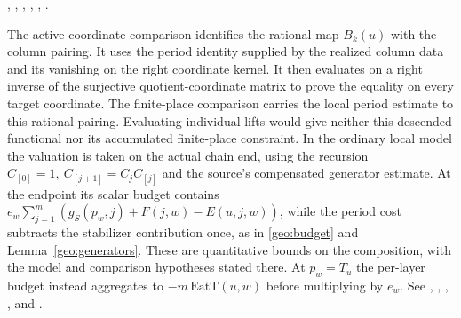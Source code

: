 \noindent
{},
,
,
,
,
.

The active coordinate comparison  identifies the rational map \(B_k(u)\) with the column pairing. It uses the period identity supplied by the realized column data and its vanishing on the right coordinate kernel. It then evaluates on a right inverse of the surjective quotient-coordinate matrix to prove the equality on every target coordinate. The finite-place comparison  carries the local period estimate to this rational pairing. Evaluating individual lifts would give neither this descended functional nor its accumulated finite-place constraint. In the ordinary local model the valuation is taken on the actual chain end, using the recursion \(C_{[0]}=1,\ C_{[j+1]}=C_j C_{[j]}\) and the source's compensated generator estimate. At the endpoint its scalar budget contains \(e_w\sum_{j=1}^{m}(g_S(p_w,j)+F(j,w)-E(u,j,w))\), while the period cost subtracts the stabilizer contribution once, as in \eqref{geo:budget} and Lemma~\ref{geo:generators}. These are quantitative bounds on the composition, with the model and comparison hypotheses stated there. At \(p_w=T_u\) the per-layer budget instead aggregates to \(-m\,\mathrm{EatT}(u,w)\) before multiplying by \(e_w\). See , , , , and .
